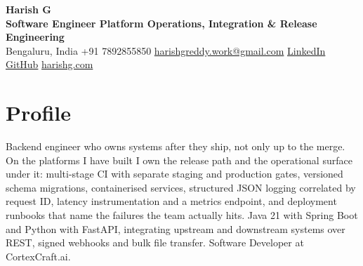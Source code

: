 \documentclass[10pt,a4paper]{article}
\begin{document}
{\LARGE\bfseries Harish G}\\[1pt]
{\small\bfseries Software Engineer \textbar{} Platform Operations, Integration \& Release Engineering}\\[2pt]
{\small Bengaluru, India \quad\textbar\quad +91 7892855850 \quad\textbar\quad
\href{mailto:harishgreddy.work@gmail.com}{harishgreddy.work@gmail.com} \quad\textbar\quad
\href{https://www.linkedin.com/in/harishgreddy/}{LinkedIn} \quad\textbar\quad \href{https://github.com/harish00506/}{GitHub} \quad\textbar\quad \href{https://www.harishg.com}{harishg.com}}

\section{Profile}
Backend engineer who owns systems after they ship, not only up to the merge. On the platforms I have
built I own the release path and the operational surface under it: multi-stage CI with separate
staging and production gates, versioned schema migrations, containerised services, structured JSON
logging correlated by request ID, latency instrumentation and a metrics endpoint, and deployment
runbooks that name the failures the team actually hits. Java 21 with Spring Boot and Python with
FastAPI, integrating upstream and downstream systems over REST, signed webhooks and bulk file
transfer. Software Developer at CortexCraft.ai.

\end{document}
